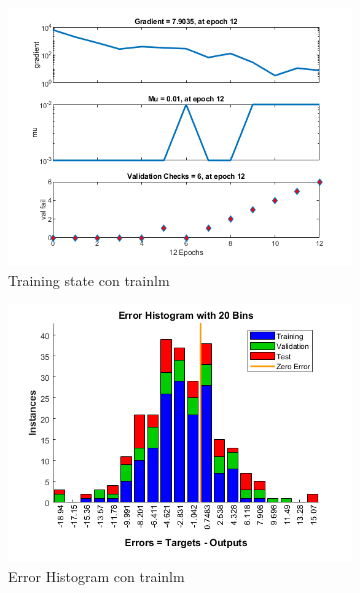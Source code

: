 \documentclass[a4paper, 12pt]{article}
\begin{document}
\begin{figure}[htp!]
\begin{subfigure}{0.49\textwidth}
                        \includegraphics[width=\textwidth]{figures/parte1/Ej3/Ej3_training_state_trainlm_60.png}
                        \caption{Training state con trainlm}
                    \end{subfigure}
                    \begin{subfigure}{0.49\textwidth}
                        \includegraphics[width=\textwidth]{figures/parte1/Ej3/Ej3_error_trainlm_60.png}
                        \caption{Error Histogram con trainlm}
                    \end{subfigure}
                    \begin{subfigure}{0.49\textwidth}

\end{subfigure}
\end{figure}
\end{document}
